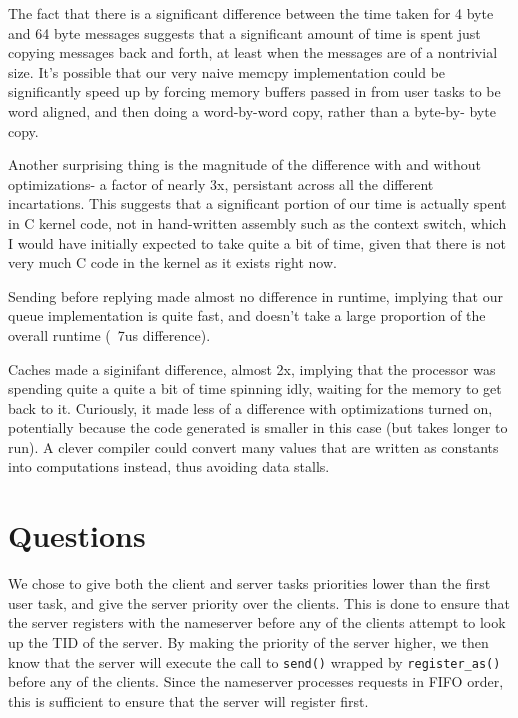 \documentclass[titlepage]{article}
\begin{document}


The fact that there is a significant difference between the time taken for 4
byte and 64 byte messages suggests that a significant amount of time is spent
just copying messages back and forth, at least when the messages are of a
nontrivial size. It's possible that our very naive memcpy implementation could
be significantly speed up by forcing memory buffers passed in from user tasks
to be word aligned, and then doing a word-by-word copy, rather than a byte-by-
byte copy.

Another surprising thing is the magnitude of the difference with and without
optimizations- a factor of nearly 3x, persistant across all the different
incartations. This suggests that a significant portion of our time is actually
spent in C kernel code, not in hand-written assembly such as the context switch,
which I would have initially expected to take quite a bit of time, given that
there is not very much C code in the kernel as it exists right now.

Sending before replying made almost no difference in runtime, implying that our queue
implementation is quite fast, and doesn't take a large proportion of the overall
runtime (~7us difference).

Caches made a siginifant difference, almost 2x, implying that the processor was
spending quite a quite a bit of time spinning idly, waiting for the memory to
get back to it. Curiously, it made less of a difference with optimizations
turned on, potentially because the code generated is smaller in this case (but
takes longer to run). A clever compiler could convert many values that are
written as constants into computations instead, thus avoiding data stalls.

\section{Questions}
We chose to give both the client and server tasks priorities lower than
the first user task, and give the server priority over the clients.
This is done to ensure that the server registers with the nameserver before
any of the clients attempt to look up the TID of the server.
By making the priority of the server higher, we then know that the server will
execute the call to \texttt{send()} wrapped by \texttt{register\_as()} before
any of the clients.
Since the nameserver processes requests in FIFO order, this is sufficient to
ensure that the server will register first.
\end{document}
